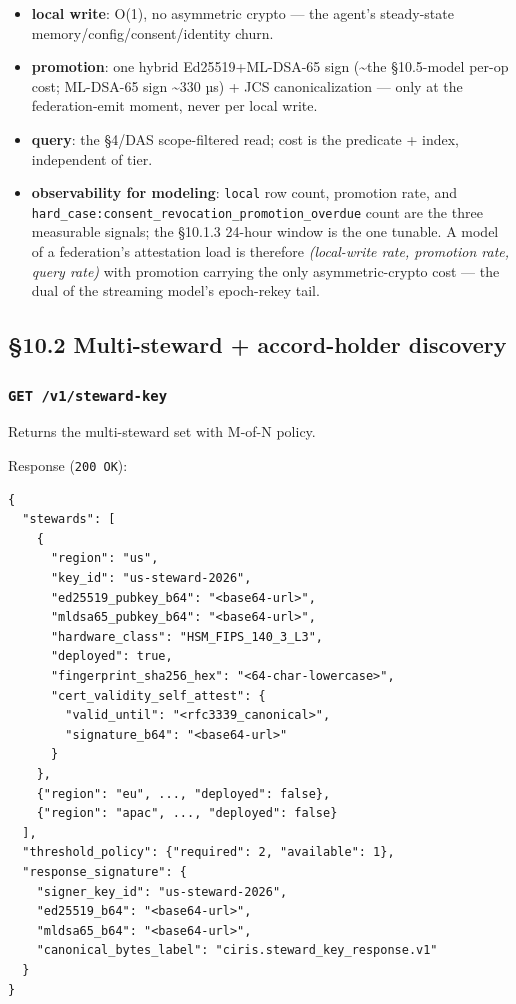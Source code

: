\documentclass[11pt]{article}
\begin{document}
\begin{itemize}\setlength\itemsep{0pt}
\item \textbf{local write}: O(1), no asymmetric crypto — the agent's steady-state memory/config/consent/identity churn.
\item \textbf{promotion}: one hybrid Ed25519+ML-DSA-65 sign (\textasciitilde{}the §10.5-model per-op cost; ML-DSA-65 sign \textasciitilde{}330 µs) + JCS canonicalization — only at the federation-emit moment, never per local write.
\item \textbf{query}: the §4/DAS scope-filtered read; cost is the predicate + index, independent of tier.
\item \textbf{observability for modeling}: \texttt{local} row count, promotion rate, and \texttt{hard\_case:consent\_revocation\_promotion\_overdue} count are the three measurable signals; the §10.1.3 24-hour window is the one tunable. A model of a federation's attestation load is therefore \textit{(local-write rate, promotion rate, query rate)} with promotion carrying the only asymmetric-crypto cost — the dual of the streaming model's epoch-rekey tail.
\end{itemize}


\subsection*{§10.2 Multi-steward + accord-holder discovery}


\subsubsection*{\texttt{GET /v1/steward-key}}


Returns the multi-steward set with M-of-N policy.


Response (\texttt{200 OK}):


\begin{lstlisting}
{
  "stewards": [
    {
      "region": "us",
      "key_id": "us-steward-2026",
      "ed25519_pubkey_b64": "<base64-url>",
      "mldsa65_pubkey_b64": "<base64-url>",
      "hardware_class": "HSM_FIPS_140_3_L3",
      "deployed": true,
      "fingerprint_sha256_hex": "<64-char-lowercase>",
      "cert_validity_self_attest": {
        "valid_until": "<rfc3339_canonical>",
        "signature_b64": "<base64-url>"
      }
    },
    {"region": "eu", ..., "deployed": false},
    {"region": "apac", ..., "deployed": false}
  ],
  "threshold_policy": {"required": 2, "available": 1},
  "response_signature": {
    "signer_key_id": "us-steward-2026",
    "ed25519_b64": "<base64-url>",
    "mldsa65_b64": "<base64-url>",
    "canonical_bytes_label": "ciris.steward_key_response.v1"
  }
}
\end{lstlisting}
\end{document}
